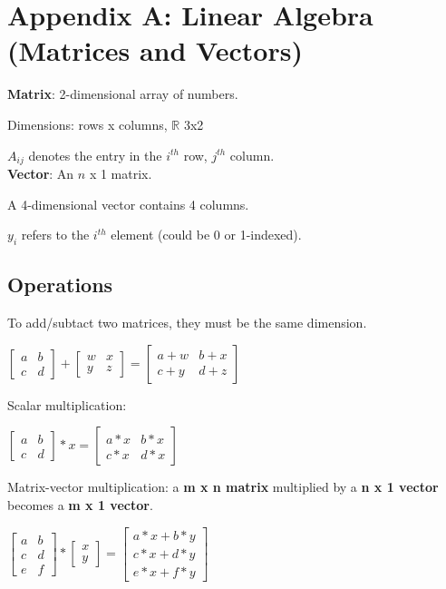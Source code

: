 \documentclass[12pt] {article}
\begin{document}
{\newpage  

\section{Appendix A: Linear Algebra (Matrices and Vectors)}

  \textbf{Matrix}: 2-dimensional array of numbers.

  Dimensions: rows x columns, $\mathbb{R}$ 3x2

  $A_{ij}$ denotes the entry in the $i^{th}$ row, $j^{th}$ column.\\

  \textbf{Vector}: An $n$ x 1 matrix.

  A 4-dimensional vector contains 4 columns.

  $y_i$ refers to the $i^{th}$ element (could be 0 or 1-indexed).

  \subsection{Operations}

    To add/subtact two matrices, they must be the same dimension.
    
    $\begin{bmatrix} a & b \\ c & d \end{bmatrix} + \begin{bmatrix} w & x \\ 
    y & z \end{bmatrix} = \begin{bmatrix} a+w & b+x \\ c+y & d+z \end{bmatrix}$
    
    Scalar multiplication:

    $\begin{bmatrix} a & b \\ c & d \end{bmatrix} * x = \begin{bmatrix} a*x & 
    b*x \\ c*x & d*x \end{bmatrix}$

    Matrix-vector multiplication: a \textbf{m x n matrix} multiplied by a  
    \textbf{n x 1 vector} becomes a \textbf{m x 1 vector}. 

    $\begin{bmatrix} a & b \\ c & d \\ e & f \end{bmatrix} * \begin{bmatrix} 
    x \\ y \end{bmatrix} = \begin{bmatrix} a*x+b*y \\ c*x+d*y \\ e*x+f*y
    \end{bmatrix}$

}
\end{document}
